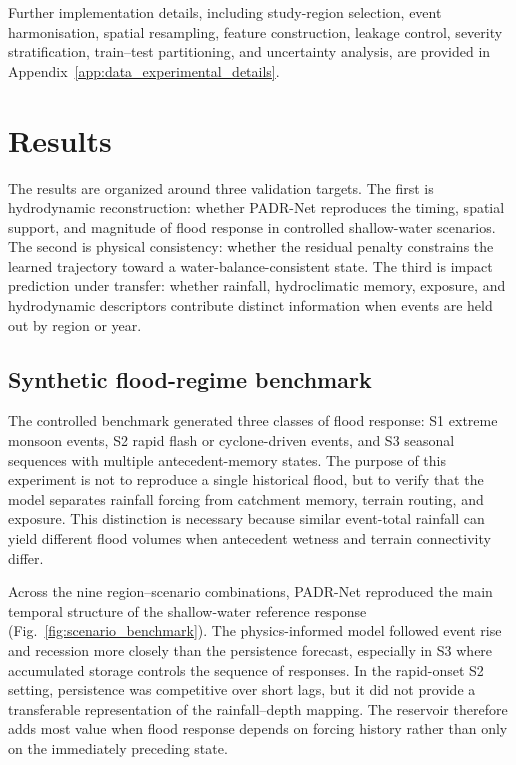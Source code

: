 \documentclass[pdflatex,sn-mathphys-ay]{sn-jnl}
\theoremstyle{thmstyleone}
\begin{document}
Further implementation details, including study-region selection,
event harmonisation, spatial resampling, feature construction,
leakage control, severity stratification, train--test partitioning,
and uncertainty analysis, are provided in
Appendix~\ref{app:data_experimental_details}.



\section{Results}
\label{sec:results}

The results are organized around three validation targets.  The first
is hydrodynamic reconstruction: whether PADR-Net reproduces the timing,
spatial support, and magnitude of flood response in controlled
shallow-water scenarios.  The second is physical consistency: whether
the residual penalty constrains the learned trajectory toward a
water-balance-consistent state.  The third is impact prediction under
transfer: whether rainfall, hydroclimatic memory, exposure, and
hydrodynamic descriptors contribute distinct information when events
are held out by region or year.

\subsection{Synthetic flood-regime benchmark}
\label{subsec:synthetic_results}

The controlled benchmark generated three classes of flood response:
S1 extreme monsoon events, S2 rapid flash or cyclone-driven events,
and S3 seasonal sequences with multiple antecedent-memory states.  The
purpose of this experiment is not to reproduce a single historical
flood, but to verify that the model separates rainfall forcing from
catchment memory, terrain routing, and exposure.  This distinction is
necessary because similar event-total rainfall can yield different
flood volumes when antecedent wetness and terrain connectivity differ.

Across the nine region--scenario combinations, PADR-Net reproduced the
main temporal structure of the shallow-water reference response
(Fig.~\ref{fig:scenario_benchmark}).  The physics-informed model
followed event rise and recession more closely than the persistence
forecast, especially in S3 where accumulated storage controls the
sequence of responses.  In the rapid-onset S2 setting, persistence was
competitive over short lags, but it did not provide a transferable
representation of the rainfall--depth mapping.  The reservoir therefore
adds most value when flood response depends on forcing history rather
than only on the immediately preceding state.
\end{document}
